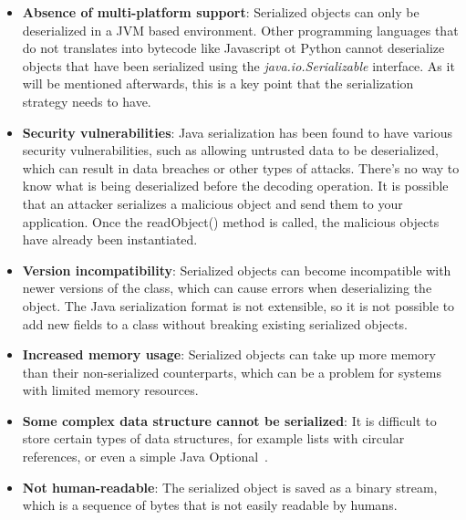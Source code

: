 \begin{itemize}
	\item \textbf{Absence of multi-platform support}: Serialized objects can only be deserialized in a JVM based environment. Other programming languages that do not translates into bytecode like Javascript ot Python cannot deserialize objects that have been serialized using the \textit{java.io.Serializable} interface. As it will be mentioned afterwards, this is a key point that the serialization strategy needs to have.
	\item \textbf{Security vulnerabilities}: Java serialization has been found to have various security vulnerabilities, such as allowing untrusted data to be deserialized, which can result in data breaches or other types of attacks. There’s no way to know what is being deserialized before the decoding operation. It is possible that an attacker serializes a malicious object and send them to your application. Once the readObject() method is called, the malicious objects have already been instantiated.~\cite{AvoidJav95:online}
	\item \textbf{Version incompatibility}: Serialized objects can become incompatible with newer versions of the class, which can cause errors when deserializing the object. The Java serialization format is not extensible, so it is not possible to add new fields to a class without breaking existing serialized objects.
	\item \textbf{Increased memory usage}: Serialized objects can take up more memory than their non-serialized counterparts, which can be a problem for systems with limited memory resources.
	\item \textbf{Some complex data structure cannot be serialized}: It is difficult to store certain types of data structures, for example lists with circular references, or even a simple Java Optional~\cite{Optional58:online}.
	\item \textbf{Not human-readable}: The serialized object is saved as a binary stream, which is a sequence of bytes that is not easily readable by humans.
\end{itemize}
